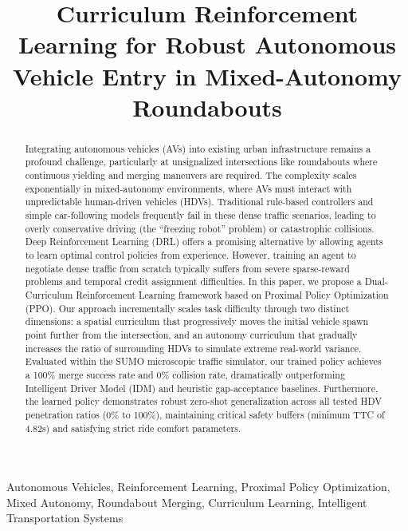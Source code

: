 \documentclass[conference]{IEEEtran}
\begin{document}
\title{Curriculum Reinforcement Learning for Robust Autonomous Vehicle Entry in Mixed-Autonomy Roundabouts}

\author{
}

\maketitle

\begin{abstract}
Integrating autonomous vehicles (AVs) into existing urban infrastructure remains a profound challenge, particularly at unsignalized intersections like roundabouts where continuous yielding and merging maneuvers are required. The complexity scales exponentially in mixed-autonomy environments, where AVs must interact with unpredictable human-driven vehicles (HDVs). Traditional rule-based controllers and simple car-following models frequently fail in these dense traffic scenarios, leading to overly conservative driving (the ``freezing robot'' problem) or catastrophic collisions. Deep Reinforcement Learning (DRL) offers a promising alternative by allowing agents to learn optimal control policies from experience. However, training an agent to negotiate dense traffic from scratch typically suffers from severe sparse-reward problems and temporal credit assignment difficulties. In this paper, we propose a Dual-Curriculum Reinforcement Learning framework based on Proximal Policy Optimization (PPO). Our approach incrementally scales task difficulty through two distinct dimensions: a spatial curriculum that progressively moves the initial vehicle spawn point further from the intersection, and an autonomy curriculum that gradually increases the ratio of surrounding HDVs to simulate extreme real-world variance. Evaluated within the SUMO microscopic traffic simulator, our trained policy achieves a 100\% merge success rate and 0\% collision rate, dramatically outperforming Intelligent Driver Model (IDM) and heuristic gap-acceptance baselines. Furthermore, the learned policy demonstrates robust zero-shot generalization across all tested HDV penetration ratios (0\% to 100\%), maintaining critical safety buffers (minimum TTC of 4.82s) and satisfying strict ride comfort parameters.
\end{abstract}

\begin{IEEEkeywords}
Autonomous Vehicles, Reinforcement Learning, Proximal Policy Optimization, Mixed Autonomy, Roundabout Merging, Curriculum Learning, Intelligent Transportation Systems
\end{IEEEkeywords}
\end{document}
